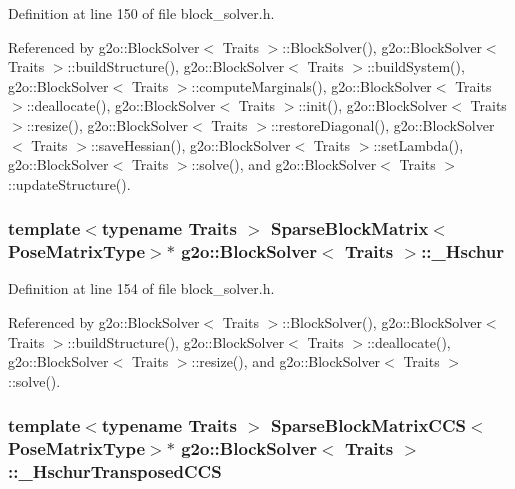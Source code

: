 Definition at line 150 of file block\+\_\+solver.\+h.



Referenced by g2o\+::\+Block\+Solver$<$ Traits $>$\+::\+Block\+Solver(), g2o\+::\+Block\+Solver$<$ Traits $>$\+::build\+Structure(), g2o\+::\+Block\+Solver$<$ Traits $>$\+::build\+System(), g2o\+::\+Block\+Solver$<$ Traits $>$\+::compute\+Marginals(), g2o\+::\+Block\+Solver$<$ Traits $>$\+::deallocate(), g2o\+::\+Block\+Solver$<$ Traits $>$\+::init(), g2o\+::\+Block\+Solver$<$ Traits $>$\+::resize(), g2o\+::\+Block\+Solver$<$ Traits $>$\+::restore\+Diagonal(), g2o\+::\+Block\+Solver$<$ Traits $>$\+::save\+Hessian(), g2o\+::\+Block\+Solver$<$ Traits $>$\+::set\+Lambda(), g2o\+::\+Block\+Solver$<$ Traits $>$\+::solve(), and g2o\+::\+Block\+Solver$<$ Traits $>$\+::update\+Structure().

\subsubsection[{\texorpdfstring{\+\_\+\+Hschur}{_Hschur}}]{\setlength{\rightskip}{0pt plus 5cm}template$<$typename Traits $>$ {\bf Sparse\+Block\+Matrix}$<${\bf Pose\+Matrix\+Type}$>$$\ast$ {\bf g2o\+::\+Block\+Solver}$<$ Traits $>$\+::\+\_\+\+Hschur\hspace{0.3cm}{\ttfamily [protected]}}\hypertarget{classg2o_1_1BlockSolver_a46977934a3e4fb0cd36bc4181ed3ec0e}{}\label{classg2o_1_1BlockSolver_a46977934a3e4fb0cd36bc4181ed3ec0e}


Definition at line 154 of file block\+\_\+solver.\+h.



Referenced by g2o\+::\+Block\+Solver$<$ Traits $>$\+::\+Block\+Solver(), g2o\+::\+Block\+Solver$<$ Traits $>$\+::build\+Structure(), g2o\+::\+Block\+Solver$<$ Traits $>$\+::deallocate(), g2o\+::\+Block\+Solver$<$ Traits $>$\+::resize(), and g2o\+::\+Block\+Solver$<$ Traits $>$\+::solve().

\subsubsection[{\texorpdfstring{\+\_\+\+Hschur\+Transposed\+C\+CS}{_HschurTransposedCCS}}]{\setlength{\rightskip}{0pt plus 5cm}template$<$typename Traits $>$ {\bf Sparse\+Block\+Matrix\+C\+CS}$<${\bf Pose\+Matrix\+Type}$>$$\ast$ {\bf g2o\+::\+Block\+Solver}$<$ Traits $>$\+::\+\_\+\+Hschur\+Transposed\+C\+CS\hspace{0.3cm}{\ttfamily [protected]}}\hypertarget{classg2o_1_1BlockSolver_acea4b8ea8db5a29b63bea4bc568b0b26}{}\label{classg2o_1_1BlockSolver_acea4b8ea8db5a29b63bea4bc568b0b26}


